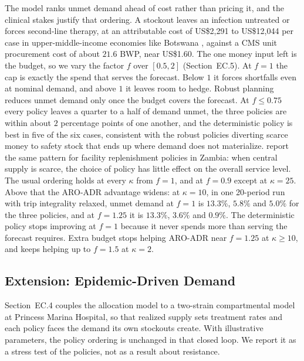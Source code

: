 \documentclass[11pt]{article}
\begin{document}
The model ranks unmet demand ahead of cost rather than pricing it, and the clinical stakes justify that ordering.
A stockout leaves an infection untreated or forces second-line therapy, at an attributable cost of US\$2{,}291 to US\$12{,}044 per case in upper-middle-income economies like Botswana \citep{poudel2023}, against a CMS unit procurement cost of about $21.6$ BWP, near US\$1.60.
The one money input left is the budget, so we vary the factor $f$ over $[0.5, 2]$ (Section~EC.5).
At $f = 1$ the cap is exactly the spend that serves the forecast.
Below $1$ it forces shortfalls even at nominal demand, and above $1$ it leaves room to hedge.
Robust planning reduces unmet demand only once the budget covers the forecast.
At $f \le 0.75$ every policy leaves a quarter to a half of demand unmet, the three policies are within about $2$ percentage points of one another, and the deterministic policy is best in five of the six cases, consistent with the robust policies diverting scarce money to safety stock that ends up where demand does not materialize.
\citet{gallien21} report the same pattern for facility replenishment policies in Zambia: when central supply is scarce, the choice of policy has little effect on the overall service level.
The usual ordering holds at every $\kappa$ from $f = 1$, and at $f = 0.9$ except at $\kappa = 25$.
Above that the ARO-ADR advantage widens: at $\kappa = 10$, in one 20-period run with trip integrality relaxed, unmet demand at $f = 1$ is $13.3\%$, $5.8\%$ and $5.0\%$ for the three policies, and at $f = 1.25$ it is $13.3\%$, $3.6\%$ and $0.9\%$.
The deterministic policy stops improving at $f = 1$ because it never spends more than serving the forecast requires.
Extra budget stops helping ARO-ADR near $f = 1.25$ at $\kappa \ge 10$, and keeps helping up to $f = 1.5$ at $\kappa = 2$.

\subsection{Extension: Epidemic-Driven Demand}
\label{sec:seir}

Section~EC.4 couples the allocation model to a two-strain compartmental model at Princess Marina Hospital, so that realized supply sets treatment rates and each policy faces the demand its own stockouts create.
With illustrative parameters, the policy ordering is unchanged in that closed loop.
We report it as a stress test of the policies, not as a result about resistance.

\end{document}
